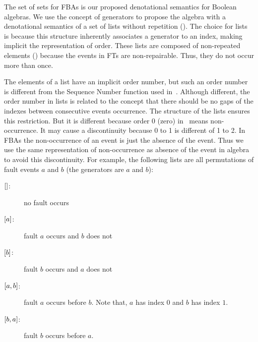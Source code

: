 The set of sets for \acp{FBA} is our proposed denotational semantics for Boolean algebras.
We use the concept of generators to propose the \ac{algebra} with a denotational semantics of a set of lists without repetition (\distinctlists).
The choice for lists is because this structure inherently associates a generator to an index, making implicit the representation of order.
These lists are composed of non-repeated elements (\distinctlists) because the events in \aclp{FT} are non-repairable.
Thus, they do not occur more than once.

The elements of a list have an implicit order number, but such an order number is different from the Sequence Number function used in~\cite{WP2009,Walker2009}.
Although different, the order number in lists is related to the concept that there should be no gaps of the indexes between consecutive events occurrence.
The structure of the lists ensures this restriction.
But it is different because order 0 (zero) in~\cite{WP2009,Walker2009} means non-occurrence.
It may cause a discontinuity because 0 to 1 is different of 1 to 2.
In \acp{FBA} the non-occurrence of an event is just the absence of the event.
Thus we use the same representation of non-occurrence as absence of the event in \ac{algebra} to avoid this discontinuity.
For example, the following lists are all permutations of fault events $a$ and $b$ (the generators are $a$ and $b$):
\begin{description}
	\item[$[] $: ] no fault occurs
	\item[$\left[ a \right]$: ] fault $a$ occurs and $b$ does not
	\item[$\left[ b \right]$: ] fault $b$ occurs and $a$ does not
	\item[$\left[ a,b \right]$: ] fault $a$ occurs before $b$. Note that, $a$ has index $0$ and $b$ has index $1$.
	\item[$\left[ b,a \right]$: ] fault $b$ occurs before $a$.
\end{description}




